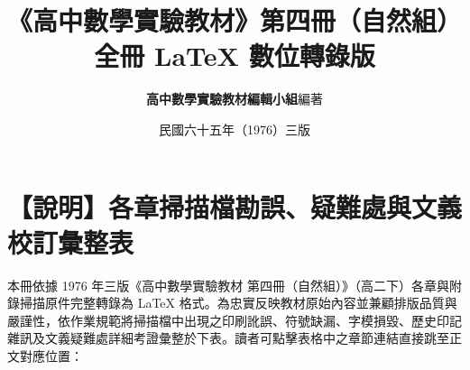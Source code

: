 \documentclass[a4paper,12pt,twoside]{article}
\title{\LARGE\textbf{《高中數學實驗教材》第四冊（自然組）}\\[0.5em] \Large\textbf{全冊 \LaTeX{} 數位轉錄版}}
\author{\textbf{高中數學實驗教材編輯小組}\quad 編著}
\date{民國六十五年（1976）三版}
\begin{document}
\maketitle
\thispagestyle{empty}

\section*{【說明】各章掃描檔勘誤、疑難處與文義校訂彙整表}
\label{sec:master_errata_notes_b4}

本冊依據 1976 年三版《高中數學實驗教材 第四冊（自然組）》（高二下）各章與附錄掃描原件完整轉錄為 \LaTeX{} 格式。為忠實反映教材原始內容並兼顧排版品質與嚴謹性，依作業規範將掃描檔中出現之印刷訛誤、符號缺漏、字模損毀、歷史印記雜訊及文義疑難處詳細考證彙整於下表。讀者可點擊表格中之章節連結直接跳至正文對應位置：
\end{document}
